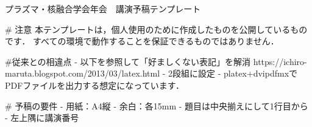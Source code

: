 プラズマ・核融合学会年会　講演予稿テンプレート

# 注意
本テンプレートは，個人使用のために作成したものを公開しているものです．
すべての環境で動作することを保証できるものではありません．

#従来との相違点
- 以下を参照して「好ましくない表記」を解消
  https://ichiro-maruta.blogspot.com/2013/03/latex.html
- 2段組に設定
- platex+dvipdfmxでPDFファイルを出力する想定になっています．

# 予稿の要件
- 用紙：A4縦
- 余白：各15mm
- 題目は中央揃えにして1行目から
- 左上隅に講演番号
